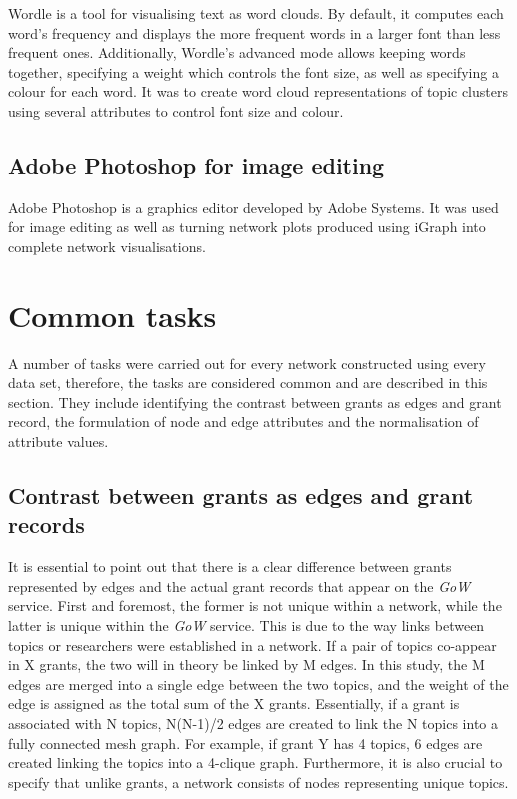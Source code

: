 Wordle \cite{wordle} is a tool for visualising text as word clouds. By default, it computes each word's frequency and displays the more frequent words in a larger font than less frequent ones. Additionally, Wordle's advanced mode allows keeping words together, specifying a weight which controls the font size, as well as specifying a colour for each word. It was to create word cloud representations of topic clusters using several attributes to control font size and colour.

\subsection{Adobe Photoshop for image editing}

Adobe Photoshop \cite{adobe_photoshop} is a graphics editor developed by Adobe Systems. It was used for image editing as well as turning network plots produced using iGraph into complete network visualisations.

\section{Common tasks}

A number of tasks were carried out for every network constructed using every data set, therefore, the tasks are considered common and are described in this section. They include identifying the contrast between grants as edges and grant record, the formulation of node and edge attributes and the normalisation of attribute values.

\subsection{Contrast between grants as edges and grant records}

It is essential to point out that there is a clear difference between grants represented by edges and the actual grant records that appear on the \textit{GoW} service. First and foremost, the former is not unique within a network, while the latter is unique within the \textit{GoW} service. This is due to the way links between topics or researchers were established in a network. If a pair of topics co-appear in X grants, the two will in theory be linked by M edges. In this study, the M edges are merged into a single edge between the two topics, and the weight of the edge is assigned as the total sum of the X grants. Essentially, if a grant is associated with N topics, N(N-1)/2 edges are created to link the N topics into a fully connected mesh graph. For example, if grant Y has 4 topics, 6 edges are created linking the topics into a 4-clique graph. Furthermore, it is also crucial to specify that unlike grants, a network consists of nodes representing unique topics.

